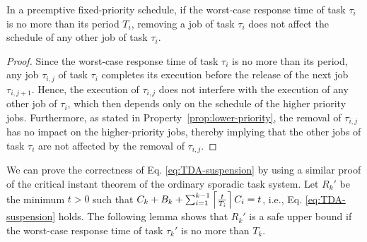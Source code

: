 \begin{lemma}
\label{lemma:remove-same-task}
In a preemptive fixed-priority schedule, if the worst-case response time of task $\tau_i$ is no more than its period $T_i$, removing a job of task $\tau_i$ does not affect the schedule of any other job of task $\tau_i$.
\end{lemma}
\begin{proof}
Since the worst-case response time of task $\tau_i$ is no more than its period, any job $\tau_{i,j}$ of task $\tau_i$ completes its execution before the release of the next job $\tau_{i,j+1}$. Hence, the execution of $\tau_{i,j}$ does not interfere with the execution of any other job of $\tau_i$, which then depends only on the schedule of the higher priority jobs. Furthermore, as stated in Property~\ref{prop:lower-priority}, the removal of $\tau_{i,j}$ has no impact on the higher-priority jobs, thereby implying that the other jobs of task $\tau_i$ are not affected by the removal of $\tau_{i,j}$.
\end{proof}

We can prove the correctness of Eq. \eqref{eq:TDA-suspension} by using a similar proof of the critical instant theorem of the ordinary sporadic task system.
Let $R_k'$ be the minimum $t > 0$ such that  $C_k + B_k + \sum_{i=1}^{k-1}\left\lceil{\frac{t}{T_i}}\right\rceil C_i = t$, i.e., Eq. \eqref{eq:TDA-suspension} holds. The following lemma shows that $R_k'$ is a safe upper bound if the worst-case response time of task $\tau_k'$ is no more than $T_k$.

